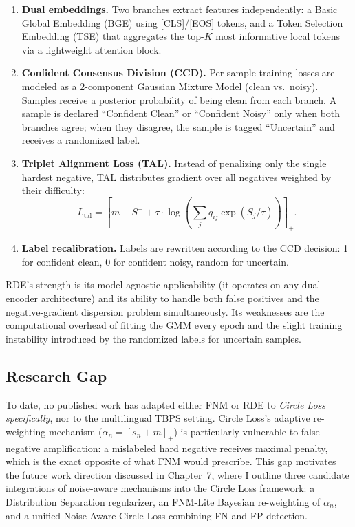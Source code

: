 \documentclass[../main.tex]{subfiles}
\begin{document}
\begin{enumerate}
    \item \textbf{Dual embeddings.} Two branches extract features independently: a Basic Global Embedding (BGE) using [CLS]/[EOS] tokens, and a Token Selection Embedding (TSE) that aggregates the top-$K$ most informative local tokens via a lightweight attention block.
    \item \textbf{Confident Consensus Division (CCD).} Per-sample training losses are modeled as a 2-component Gaussian Mixture Model (clean vs.\ noisy). Samples receive a posterior probability of being clean from each branch. A sample is declared ``Confident Clean'' or ``Confident Noisy'' only when both branches agree; when they disagree, the sample is tagged ``Uncertain'' and receives a randomized label.
    \item \textbf{Triplet Alignment Loss (TAL).} Instead of penalizing only the single hardest negative, TAL distributes gradient over all negatives weighted by their difficulty:
    \[
    L_{\text{tal}} = \left[m - S^{+} + \tau \cdot \log \left( \sum_j q_{ij} \exp(S_j / \tau) \right) \right]_{+}.
    \]
    \item \textbf{Label recalibration.} Labels are rewritten according to the CCD decision: 1 for confident clean, 0 for confident noisy, random for uncertain.
\end{enumerate}

\noindent RDE's strength is its model-agnostic applicability (it operates on any dual-encoder architecture) and its ability to handle both false positives and the negative-gradient dispersion problem simultaneously. Its weaknesses are the computational overhead of fitting the GMM every epoch and the slight training instability introduced by the randomized labels for uncertain samples.

\subsection{Research Gap}

\noindent To date, no published work has adapted either FNM or RDE to \textit{Circle Loss specifically}, nor to the multilingual TBPS setting. Circle Loss's adaptive re-weighting mechanism ($\alpha_n = [s_n + m]_+$) is particularly vulnerable to false-negative amplification: a mislabeled hard negative receives maximal penalty, which is the exact opposite of what FNM would prescribe. This gap motivates the future work direction discussed in Chapter~7, where I outline three candidate integrations of noise-aware mechanisms into the Circle Loss framework: a Distribution Separation regularizer, an FNM-Lite Bayesian re-weighting of $\alpha_n$, and a unified Noise-Aware Circle Loss combining FN and FP detection.
\end{document}
